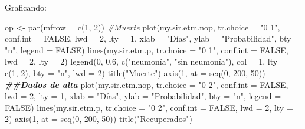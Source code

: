 \documentclass[
]{article}
\newenvironment{Shaded}{\begin{snugshade}}{\end{snugshade}}
\newcommand{\AttributeTok}[1]{\textcolor[rgb]{0.77,0.63,0.00}{#1}}
\newcommand{\CommentTok}[1]{\textcolor[rgb]{0.56,0.35,0.01}{\textit{#1}}}
\newcommand{\ConstantTok}[1]{\textcolor[rgb]{0.00,0.00,0.00}{#1}}
\newcommand{\DecValTok}[1]{\textcolor[rgb]{0.00,0.00,0.81}{#1}}
\newcommand{\DocumentationTok}[1]{\textcolor[rgb]{0.56,0.35,0.01}{\textbf{\textit{#1}}}}
\newcommand{\FloatTok}[1]{\textcolor[rgb]{0.00,0.00,0.81}{#1}}
\newcommand{\FunctionTok}[1]{\textcolor[rgb]{0.00,0.00,0.00}{#1}}
\newcommand{\NormalTok}[1]{#1}
\newcommand{\OtherTok}[1]{\textcolor[rgb]{0.56,0.35,0.01}{#1}}
\newcommand{\StringTok}[1]{\textcolor[rgb]{0.31,0.60,0.02}{#1}}
\begin{document}
Graficando:

\begin{Shaded}
\begin{Highlighting}[]
\NormalTok{op }\OtherTok{\textless{}{-}} \FunctionTok{par}\NormalTok{(}\AttributeTok{mfrow =} \FunctionTok{c}\NormalTok{(}\DecValTok{1}\NormalTok{, }\DecValTok{2}\NormalTok{)) }
\CommentTok{\#Muerte }
\FunctionTok{plot}\NormalTok{(my.sir.etm.nop, }\AttributeTok{tr.choice =} \StringTok{"0 1"}\NormalTok{, }\AttributeTok{conf.int =} \ConstantTok{FALSE}\NormalTok{, }\AttributeTok{lwd =} \DecValTok{2}\NormalTok{, }\AttributeTok{lty =} \DecValTok{1}\NormalTok{, }\AttributeTok{xlab =} \StringTok{"Días"}\NormalTok{, }\AttributeTok{ylab =} \StringTok{"Probabilidad"}\NormalTok{, }\AttributeTok{bty =} \StringTok{"n"}\NormalTok{, }\AttributeTok{legend =} \ConstantTok{FALSE}\NormalTok{)}
\FunctionTok{lines}\NormalTok{(my.sir.etm.p, }\AttributeTok{tr.choice =} \StringTok{"0 1"}\NormalTok{, }\AttributeTok{conf.int =} \ConstantTok{FALSE}\NormalTok{, }\AttributeTok{lwd =} \DecValTok{2}\NormalTok{, }\AttributeTok{lty =} \DecValTok{2}\NormalTok{)}
\FunctionTok{legend}\NormalTok{(}\DecValTok{0}\NormalTok{, }\FloatTok{0.6}\NormalTok{, }\FunctionTok{c}\NormalTok{(}\StringTok{"neumonía"}\NormalTok{, }\StringTok{"sin neumonía"}\NormalTok{), }\AttributeTok{col =} \DecValTok{1}\NormalTok{, }\AttributeTok{lty =} \FunctionTok{c}\NormalTok{(}\DecValTok{1}\NormalTok{, }\DecValTok{2}\NormalTok{), }\AttributeTok{bty =} \StringTok{"n"}\NormalTok{, }\AttributeTok{lwd =} \DecValTok{2}\NormalTok{) }
\FunctionTok{title}\NormalTok{(}\StringTok{"Muerte"}\NormalTok{) }
\FunctionTok{axis}\NormalTok{(}\DecValTok{1}\NormalTok{, }\AttributeTok{at =} \FunctionTok{seq}\NormalTok{(}\DecValTok{0}\NormalTok{, }\DecValTok{200}\NormalTok{, }\DecValTok{50}\NormalTok{)) }
\DocumentationTok{\#\#Dados de alta }
\FunctionTok{plot}\NormalTok{(my.sir.etm.nop, }\AttributeTok{tr.choice =} \StringTok{"0 2"}\NormalTok{, }\AttributeTok{conf.int =} \ConstantTok{FALSE}\NormalTok{, }\AttributeTok{lwd =} \DecValTok{2}\NormalTok{, }\AttributeTok{lty =} \DecValTok{1}\NormalTok{, }\AttributeTok{xlab =} \StringTok{"Días"}\NormalTok{, }\AttributeTok{ylab =} \StringTok{"Probabilidad"}\NormalTok{, }\AttributeTok{bty =} \StringTok{"n"}\NormalTok{, }\AttributeTok{legend =} \ConstantTok{FALSE}\NormalTok{)}
\FunctionTok{lines}\NormalTok{(my.sir.etm.p, }\AttributeTok{tr.choice =} \StringTok{"0 2"}\NormalTok{, }\AttributeTok{conf.int =} \ConstantTok{FALSE}\NormalTok{, }\AttributeTok{lwd =} \DecValTok{2}\NormalTok{, }\AttributeTok{lty =} \DecValTok{2}\NormalTok{) }
\FunctionTok{axis}\NormalTok{(}\DecValTok{1}\NormalTok{, }\AttributeTok{at =} \FunctionTok{seq}\NormalTok{(}\DecValTok{0}\NormalTok{, }\DecValTok{200}\NormalTok{, }\DecValTok{50}\NormalTok{)) }
\FunctionTok{title}\NormalTok{(}\StringTok{"Recuperados"}\NormalTok{) }
\end{Highlighting}
\end{Shaded}
\end{document}

